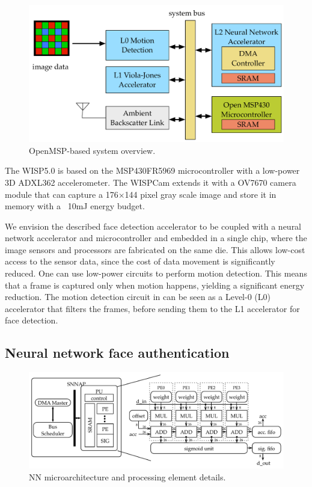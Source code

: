 \begin{figure}
  \includegraphics[width=\textwidth]{nsp-figs/system_overview.pdf}
  \caption{OpenMSP-based system overview. }
  \label{fig:OMSP}
\end{figure}


The WISP5.0 is based on the MSP430FR5969 microcontroller with a low-power 3D ADXL362 accelerometer. The WISPCam extends it with a OV7670 camera module that can capture a 176$\times$144 pixel gray scale image and store it in memory with a ~10mJ energy budget.

We envision the described face detection accelerator to be coupled with a neural network accelerator and microcontroller and embedded in a single chip, where the image sensors and processors are fabricated on the same die. This allows low-cost access to the sensor data, since the cost of data movement is significantly reduced. One can use low-power circuits to perform motion detection. This means that a frame is captured only when motion happens, yielding a significant energy reduction. The motion detection circuit in \cite{multipower-isscc13} can be seen as a Level-0 (L0) accelerator that filters the frames, before sending them to the L1 accelerator for face detection.

\subsection{Neural network face authentication}

\begin{figure}
  \includegraphics[width=\textwidth]{nsp-figs/snnap_pu_new.pdf}
  \caption{NN microarchitecture and processing element details.}
  \label{fig:snnap-pu}
\end{figure}

